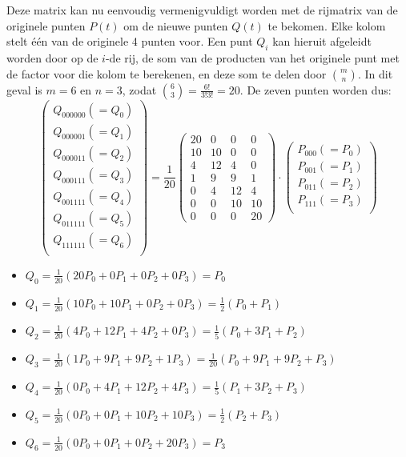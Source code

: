 \begin{itemize}
{\begin{itemize}
			Deze matrix kan nu eenvoudig vermenigvuldigt worden met de rijmatrix van de originele punten $P(t)$ om de nieuwe punten $Q(t)$ te bekomen. Elke kolom stelt één van de originele 4 punten voor. Een punt $Q_i$ kan hieruit afgeleidt worden door op de $i$-de rij, de som van 
			de producten van het originele punt met de factor voor die kolom te berekenen, en deze som te delen door $\binom{m}{n}$. In dit geval is $m = 6$ en $n = 3$, zodat $\binom{6}{3} = \frac{6!}{3! 3!} = 20$. De zeven punten worden dus:
			$$
			\begin{pmatrix}
				Q_{000000} (=Q_0) \\
				Q_{000001} (=Q_1)\\
				Q_{000011} (=Q_2)\\
				Q_{000111} (=Q_3)\\
				Q_{001111} (=Q_4)\\
				Q_{011111} (=Q_5)\\
				Q_{111111} (=Q_6)\\
			\end{pmatrix}
			= 
			\frac{1}{20}
			\begin{pmatrix}
				20 & 0  & 0  & 0  \\ 
				10 & 10 & 0  & 0  \\ 
				4  & 12 & 4  & 0  \\ 
				1  & 9  & 9  & 1  \\ 
				0  & 4  & 12 & 4  \\ 
				0  & 0  & 10 & 10 \\ 
				0  & 0  & 0  & 20 
			\end{pmatrix}
			\cdot 
			\begin{pmatrix}
				P_{000} (=P_0)\\
				P_{001} (=P_1)\\
				P_{011} (=P_2)\\
				P_{111} (=P_3)\\
			\end{pmatrix}
			$$
			\begin{itemize}
				\item $Q_0 = \frac{1}{20} (20P_0 + 0P_1  + 0P_2  + 0P_3) = P_0$
				\item $Q_1 = \frac{1}{20}(10P_0 + 10P_1 + 0P_2  + 0P_3) = \frac{1}{2}(P_0 + P_1)$ 
				\item $Q_2 = \frac{1}{20}(4P_0  + 12P_1 + 4P_2  + 0P_3) = \frac{1}{5}(P_0  + 3P_1 + P_2)$
				\item $Q_3 = \frac{1}{20}(1P_0  + 9P_1 + 9P_2  + 1P_3) = \frac{1}{20}(P_0 + 9P_1  + 9P_2 + P_3)$
				\item $Q_4 = \frac{1}{20}(0P_0  + 4P_1 + 12P_2  + 4P_3) = \frac{1}{5}(P_1  + 3P_2 + P_3)$
				\item $Q_5 = \frac{1}{20}(0P_0  + 0P_1 + 10P_2  + 10P_3) = \frac{1}{2}(P_2 + P_3)$
				\item $Q_6 = \frac{1}{20}(0P_0  + 0P_1 + 0P_2  + 20P_3) = P_3$
			\end{itemize}
			

\end{itemize}}
\end{itemize}

